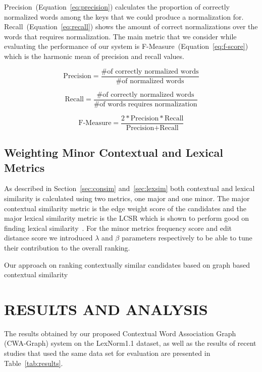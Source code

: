 \documentclass[a4paper,onesided,12pt]{report}
\begin{document}
Precision~(Equation~\ref{eq:precision}) calculates the proportion of correctly normalized words among the keys that we could produce a normalization for. Recall~(Equation~\ref{eq:recall}) shows the amount of correct normalizations over the words that requires normalization. The main metric that we consider while evaluating the performance of our system is F-Measure~(Equation~\ref{eq:f-score}) which is the harmonic mean of precision and recall values.

\begin{equation}
\text{Precision} = \frac{ \text{\# of correctly normalized words}}{ \text{\# of normalized words}}
\label{eq:precision}
\end{equation}

\begin{equation}
\text{Recall} = \frac{\text{\# of correctly normalized words}}{\text{\# of words requires normalization}}
\label{eq:recall}
\end{equation}

\begin{equation}
\text{F-Measure} = \frac{2 * \text{Precision} * \text{Recall} }{\text{Precision} + \text{Recall}}
\label{eq:f-score}
\end{equation}

\section{Weighting Minor Contextual and Lexical Metrics}

As described in Section~\ref{sec:consim} and~\ref{sec:lexsim} both contextual and lexical similarity is calculated using two metrics, one major and one minor. The major contextual similarity metric is the edge weight score of the candidates and the major lexical similarity metric is the LCSR which is shown to perform good on finding lexical similarity~\cite{Han:2011:LNS:2002472.2002520,DBLP:conf/acl/HassanM13}. For the minor metrics frequency score and edit distance score we introduced $\lambda$ and $\beta$ parameters respectively to be able to tune their contribution to the overall ranking.


Our approach on ranking contextually similar candidates based on graph based contextual similarity


\chapter{RESULTS AND ANALYSIS}

The results obtained by our proposed Contextual Word Association Graph (CWA-Graph) system on the LexNorm1.1 dataset,
as well as the results of recent studies that used the same data set for evaluation are presented in Table~\ref{tab:results}.
\end{document}
